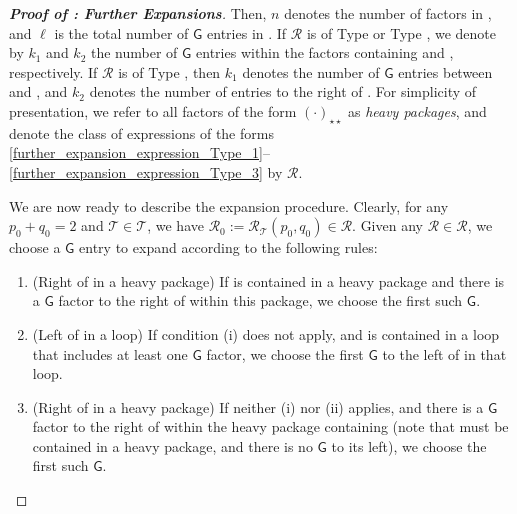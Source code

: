 \documentclass[10pt,reqno]{amsart}
\numberwithin{equation}{section}
\numberwithin{figure}{section}
\newcommand{\rmnum}[1]{\uppercase\expandafter{\romannumeral #1}}
\theoremstyle{plain} %
\theoremstyle{definition} %
\newcommand{\wt}{\widetilde}
\newcommand{\cT}{\mathcal T}
\newcommand{\cR}{{\mathcal R}}
\newcommand{\sG}{\mathsf G}
\newcommand{\scT}{{\mathscr{T}}}
\newcommand{\scR}{{\mathscr{R}}}
\newcommand{\pa}[1]{\left({#1}\right)}
\newcommand{\tLambda}{{\wt{\Lambda}}}
\newcommand{\tl}{\tLambda}
\newcommand{\mm}{\ell}
\numberwithin{equation}{section}
\begin{document}
\begin{proof}[\bf Proof of : Further Expansions]
Then, $n$ denotes the number of factors in \smash{$\Upsilon_{n}^{\pa{\mm}}$}, and $\mm$ is the total number of $\sG$ entries in \smash{$\Upsilon_{n}^{\pa{\mm}}$}. 
If $\cR$ is of Type \rmnum{1} or Type \rmnum{2}, we denote by $k_1$ and $k_2$ the number of $\sG$ entries within the factors containing \smash{$\tl_1$} and \smash{$\tl_2$}, respectively.  If $\cR$ is of Type \rmnum{3}, then $k_1$ denotes the number of $\sG$ entries between \smash{$\tl_1$} and \smash{$\tl_2$}, and $k_2$ denotes the number of entries to the right of \smash{$\tl_2$}.
For simplicity of presentation, we refer to all factors of the form $(\cdot)_{\star\star}$ as \emph{heavy packages}, and denote the class of expressions of the forms \eqref{further_expansion_expression_Type_1}–\eqref{further_expansion_expression_Type_3} by $\scR$.
 

    We are now ready to describe the expansion procedure. Clearly, for any $p_0 + q_0 = 2$ and $\cT \in \scT$, we have $\cR_0 := \cR_{\cT}(p_0, q_0) \in \scR$. Given any $\cR \in \scR$, we choose a $\sG$ entry to expand according to the following rules:
    \begin{enumerate}
        \item (Right of \smash{$\tl_2$} in a heavy package) If \smash{$\tl_2$} is contained in a heavy package and there is a $\sG$ factor to the right of \smash{$\tl_2$} within this package, we choose the first such $\sG$.
        
        
        \item (Left of \smash{$\tl_2$} in a loop) If condition (i) does not apply, and \smash{$\tl_2$} is contained in a loop that includes at least one $\sG$ factor, we choose the first $\sG$ to the left of \smash{$\tl_2$} in that loop.
                
        
        \item (Right of \smash{$\tl_1$} in a heavy package) If neither (i) nor (ii) applies, and there is a $\sG$ factor to the right of \smash{$\tl_1$} within the heavy package containing \smash{$\tl_1$} (note that \smash{$\tl_1$} must be contained in a heavy package, and there is no $\sG$ to its left), we choose the first such $\sG$.
        

\end{enumerate}
\end{proof}
\end{document}
